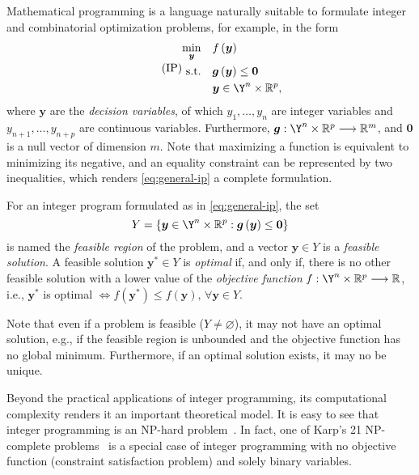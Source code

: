 Mathematical programming is a language naturally suitable to formulate integer and combinatorial optimization problems, for example, in the form
\begin{equation}\label{eq:general-ip}\tag{IP}
    \begin{split}
	\min_{\bm{y}} \quad & f\left( \bm{y} \right) \\
	\textrm{s.t.} \quad & \bm{g}\left( \bm{y} \right) \le \bm{0} \\
	  & \bm{y} \in \Y^{n}\times \R^{p}
    ,\end{split}
\end{equation}
where $\bm{y}$ are the \emph{decision variables}, of which $y_1,\ldots,y_n$ are integer variables and $y_{n+1},\ldots,y_{n+p}$ are continuous variables.
Furthermore, $\bm{g}: \Y^{n}\times \R^{p} \longrightarrow \R^{m}$,  and $\bm{0}$ is a null vector of dimension $m$.
Note that maximizing a function is equivalent to minimizing its negative, and an equality constraint can be represented by two inequalities, which renders \eqref{eq:general-ip} a complete formulation.

For an integer program formulated as in \eqref{eq:general-ip}, the set \[
Y=\left\{ \bm{y}\in \Y^{n}\times \R^{p}: \bm{g}\left( \bm{y} \right) \le \bm{0}\right\} 
\] is named the \emph{feasible region} of the problem, and a vector $\bm{y}\in Y$ is a \emph{feasible solution}.
A feasible solution $\bm{y}^{*}\in Y$ is \emph{optimal} if, and only if, there is no other feasible solution with a lower value of the \emph{objective function} $f: \Y^{n}\times \R^{p} \longrightarrow \R$, i.e., $\bm{y}^{*}$ is optimal $\iff f(\bm{y}^{*}) \le f(\bm{y}) ,\,\forall \bm{y}\in Y$.

Note that even if a problem is feasible ($Y\neq \varnothing$), it may not have an optimal solution, e.g., if the feasible region is unbounded and the objective function has no global minimum.
Furthermore, if an optimal solution exists, it may no be unique.

Beyond the practical applications of integer programming, its computational complexity renders it an important theoretical model.
It is easy to see that integer programming is an NP-hard problem~\cite{nemhauserIntegerCombinatorialOptimization1999}.
In fact, one of Karp's 21 NP-complete problems~\cite{karpReducibilityCombinatorialProblems1972} is a special case of integer programming with no objective function (constraint satisfaction problem) and solely binary variables.

